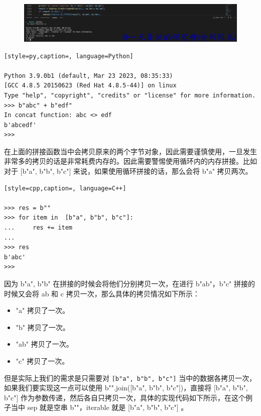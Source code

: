     \begin{figure}[H]
        \centering
            \includegraphics[scale=.2]{images/30-bytes.png}
						\caption{ }
        \label{fig:my_label}
    \end{figure}
    
\begin{lstlisting}[style=py,caption=, language=Python]

Python 3.9.0b1 (default, Mar 23 2023, 08:35:33) 
[GCC 4.8.5 20150623 (Red Hat 4.8.5-44)] on linux
Type "help", "copyright", "credits" or "license" for more information.
>>> b"abc" + b"edf"
In concat function: abc <> edf
b'abcedf'
>>> 
\end{lstlisting}
在上面的拼接函数当中会拷贝原来的两个字节对象，因此需要谨慎使用，一旦发生非常多的拷贝的话是非常耗费内存的。因此需要警惕使用循环内的内存拼接。比如对于 [b"a", b"b", b"c"] 来说，如果使用循环拼接的话，那么会将 b"a" 拷贝两次。
\begin{lstlisting}[style=cpp,caption=, language=C++]

>>> res = b""
>>> for item in  [b"a", b"b", b"c"]:
...     res += item
...
>>> res
b'abc'
>>>
\end{lstlisting}
因为 b"a", b"b" 在拼接的时候会将他们分别拷贝一次，在进行 b"ab"，b"c" 拼接的时候又会将 ab 和 c 拷贝一次，那么具体的拷贝情况如下所示：
\begin{itemize}
\item "a" 拷贝了一次。 
\item "b" 拷贝了一次。 
\item "ab" 拷贝了一次。 
\item "c" 拷贝了一次。 
\end{itemize}
但是实际上我们的需求是只需要对 \verb|[b"a", b"b", b"c"]| 当中的数据各拷贝一次，如果我们要实现这一点可以使用 b"".join([b"a", b"b", b"c"])，直接将 [b"a", b"b", b"c"] 作为参数传递，然后各自只拷贝一次，具体的实现代码如下所示，在这个例子当中 sep 就是空串 b""，iterable 就是 [b"a", b"b", b"c"] 。
